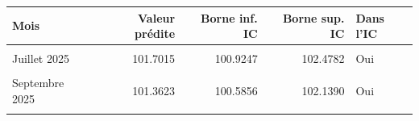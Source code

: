 \centering
\centering
\begin{tabular}[t]{lrrrl}
\toprule
Mois & Valeur prédite & Borne inf. IC & Borne sup. IC & Dans l'IC\\
\midrule
\cellcolor{gray!10}{Juin 2025} & \cellcolor{gray!10}{101.7176} & \cellcolor{gray!10}{100.9409} & \cellcolor{gray!10}{102.4943} & \cellcolor{gray!10}{Oui}\\
Juillet 2025 & 101.7015 & 100.9247 & 102.4782 & Oui\\
\cellcolor{gray!10}{Août 2025} & \cellcolor{gray!10}{101.3804} & \cellcolor{gray!10}{100.6037} & \cellcolor{gray!10}{102.1571} & \cellcolor{gray!10}{Oui}\\
Septembre 2025 & 101.3623 & 100.5856 & 102.1390 & Oui\\
\cellcolor{gray!10}{Couverture globale} & \cellcolor{gray!10}{NA} & \cellcolor{gray!10}{NA} & \cellcolor{gray!10}{NA} & \cellcolor{gray!10}{100\% (4/4)\}}\\
\bottomrule
\end{tabular}

